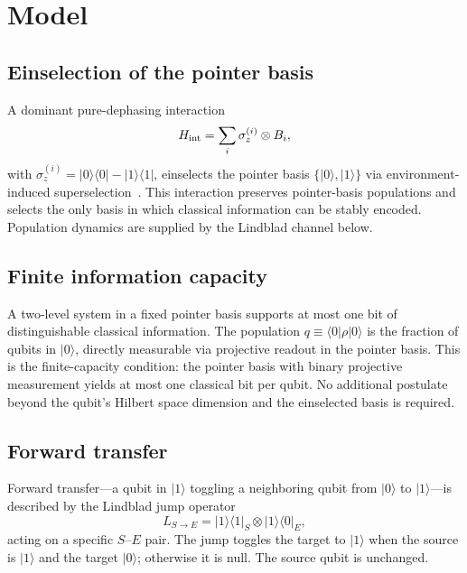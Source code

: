 \documentclass[aps,pra,twocolumn,superscriptaddress,floatfix]{revtex4-2}
\begin{document}
\section{Model}
\label{sec:model}

\subsection{Einselection of the pointer basis}

A dominant pure-dephasing interaction
\begin{equation}
H_{\rm int} = \sum_{i} \sigma_z^{(i)} \otimes B_i,
\label{eq:hint}
\end{equation}
with $\sigma_z^{(i)} = |0\rangle\langle 0| - |1\rangle\langle 1|$, einselects the pointer basis $\{|0\rangle,|1\rangle\}$ via environment-induced superselection~\cite{Zurek:2003}. This interaction preserves pointer-basis populations and selects the only basis in which classical information can be stably encoded. Population dynamics are supplied by the Lindblad channel below.

\subsection{Finite information capacity}

A two-level system in a fixed pointer basis supports at most one bit of distinguishable classical information. The population $q \equiv \langle 0|\rho|0\rangle$ is the fraction of qubits in $|0\rangle$, directly measurable via projective readout in the pointer basis. This is the finite-capacity condition: the pointer basis with binary projective measurement yields at most one classical bit per qubit. No additional postulate beyond the qubit's Hilbert space dimension and the einselected basis is required.

\subsection{Forward transfer}

Forward transfer---a qubit in $|1\rangle$ toggling a neighboring qubit from $|0\rangle$ to $|1\rangle$---is described by the Lindblad jump operator~\cite{Lindblad:1976,GKS:1976}
\begin{equation}
L_{S\to E} = |1\rangle\langle 1|_S \otimes |1\rangle\langle 0|_E,
\label{eq:jump}
\end{equation}
acting on a specific $S$--$E$ pair. The jump toggles the target to $|1\rangle$ when the source is $|1\rangle$ and the target $|0\rangle$; otherwise it is null. The source qubit is unchanged.
\end{document}

